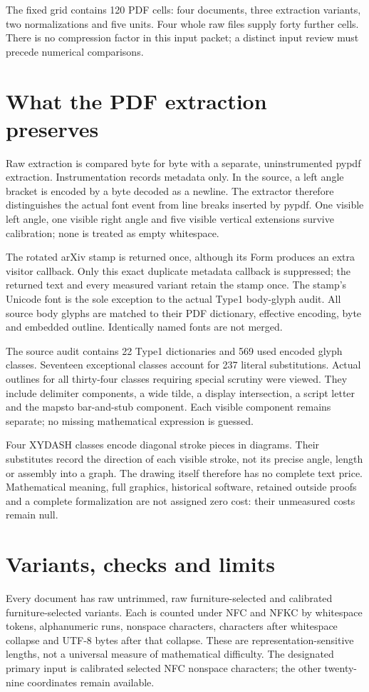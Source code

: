 \documentclass[11pt,a4paper]{article}
\begin{document}
The fixed grid contains 120 PDF cells: four documents, three extraction variants, two normalizations and five units. Four whole raw files supply forty further cells. There is no compression factor in this input packet; a distinct input review must precede numerical comparisons.
\newpage
\section*{What the PDF extraction preserves}
Raw extraction is compared byte for byte with a separate, uninstrumented pypdf extraction. Instrumentation records metadata only. In the source, a left angle bracket is encoded by a byte decoded as a newline. The extractor therefore distinguishes the actual font event from line breaks inserted by pypdf. One visible left angle, one visible right angle and five visible vertical extensions survive calibration; none is treated as empty whitespace.

The rotated arXiv stamp is returned once, although its Form produces an extra visitor callback. Only this exact duplicate metadata callback is suppressed; the returned text and every measured variant retain the stamp once. The stamp's Unicode font is the sole exception to the actual Type1 body-glyph audit. All source body glyphs are matched to their PDF dictionary, effective encoding, byte and embedded outline. Identically named fonts are not merged.

The source audit contains 22 Type1 dictionaries and 569 used encoded glyph classes. Seventeen exceptional classes account for 237 literal substitutions. Actual outlines for all thirty-four classes requiring special scrutiny were viewed. They include delimiter components, a wide tilde, a display intersection, a script letter and the mapsto bar-and-stub component. Each visible component remains separate; no missing mathematical expression is guessed.

Four XYDASH classes encode diagonal stroke pieces in diagrams. Their substitutes record the direction of each visible stroke, not its precise angle, length or assembly into a graph. The drawing itself therefore has no complete text price. Mathematical meaning, full graphics, historical software, retained outside proofs and a complete formalization are not assigned zero cost: their unmeasured costs remain null.

\section*{Variants, checks and limits}
Every document has raw untrimmed, raw furniture-selected and calibrated furniture-selected variants. Each is counted under NFC and NFKC by whitespace tokens, alphanumeric runs, nonspace characters, characters after whitespace collapse and UTF-8 bytes after that collapse. These are representation-sensitive lengths, not a universal measure of mathematical difficulty. The designated primary input is calibrated selected NFC nonspace characters; the other twenty-nine coordinates remain available.
\end{document}
